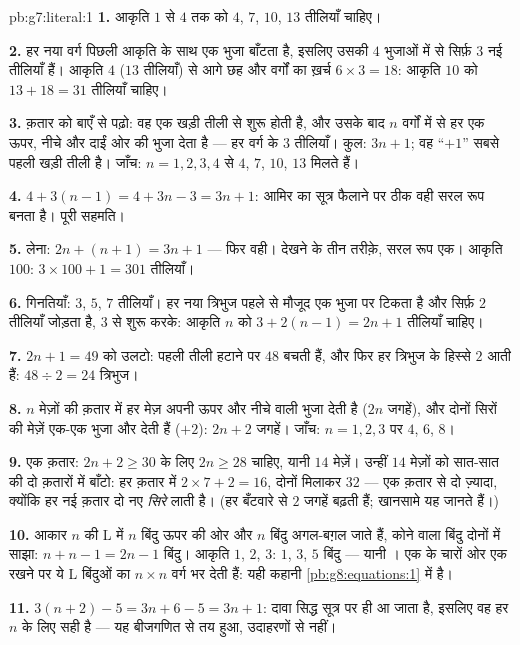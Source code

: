 \begin{solution}{pb:g7:literal:1}
\textbf{1.} आकृति $1$ से $4$ तक को $4$, $7$, $10$, $13$ तीलियाँ
चाहिए।

\textbf{2.} हर नया वर्ग पिछली आकृति के साथ एक भुजा बाँटता है,
इसलिए उसकी $4$ भुजाओं में से सिर्फ़ $3$ नई तीलियाँ हैं। आकृति
$4$ ($13$ तीलियाँ) से आगे छह और वर्गों का ख़र्च
$6 \times 3 = 18$: आकृति $10$ को $13 + 18 = 31$ तीलियाँ चाहिए।

\textbf{3.} क़तार को बाएँ से पढ़ो: वह एक खड़ी तीली से शुरू होती
है, और उसके बाद $n$ वर्गों में से हर एक ऊपर, नीचे और दाईं ओर की
भुजा देता है --- हर वर्ग के $3$ तीलियाँ। कुल: $3n + 1$; वह
``$+1$'' सबसे पहली खड़ी तीली है। जाँच: $n = 1, 2, 3, 4$ से $4$,
$7$, $10$, $13$ मिलते हैं।

\textbf{4.} $4 + 3(n - 1) = 4 + 3n - 3 = 3n + 1$: आमिर का सूत्र
फैलाने पर ठीक वही सरल रूप बनता है। पूरी सहमति।

\textbf{5.} लेना: $2n + (n + 1) = 3n + 1$ --- फिर वही। देखने के
तीन तरीक़े, सरल रूप एक। आकृति $100$: $3 \times 100 + 1 = 301$
तीलियाँ।

\textbf{6.} गिनतियाँ: $3$, $5$, $7$ तीलियाँ। हर नया त्रिभुज पहले
से मौजूद एक भुजा पर टिकता है और सिर्फ़ $2$ तीलियाँ जोड़ता है,
$3$ से शुरू करके: आकृति $n$ को $3 + 2(n - 1) = 2n + 1$ तीलियाँ
चाहिए।

\textbf{7.} $2n + 1 = 49$ को उलटो: पहली तीली हटाने पर $48$ बचती
हैं, और फिर हर त्रिभुज के हिस्से $2$ आती हैं:
$48 \div 2 = 24$ त्रिभुज।

\textbf{8.} $n$ मेज़ों की क़तार में हर मेज़ अपनी ऊपर और नीचे वाली
भुजा देती है ($2n$ जगहें), और दोनों सिरों की मेज़ें एक-एक भुजा
और देती हैं ($+2$): $2n + 2$ जगहें। जाँच: $n = 1, 2, 3$ पर $4$,
$6$, $8$।

\textbf{9.} एक क़तार: $2n + 2 \geq 30$ के लिए $2n \geq 28$ चाहिए,
यानी $14$ मेज़ें। उन्हीं $14$ मेज़ों को सात-सात की दो क़तारों में
बाँटो: हर क़तार में $2 \times 7 + 2 = 16$, दोनों मिलाकर $32$ ---
एक क़तार से दो ज़्यादा, क्योंकि हर नई क़तार दो नए \emph{सिरे}
लाती है। (हर बँटवारे से $2$ जगहें बढ़ती हैं; खानसामे यह जानते
हैं।)

\textbf{10.} आकार $n$ की L में $n$ बिंदु ऊपर की ओर और $n$ बिंदु
अगल-बग़ल जाते हैं, कोने वाला बिंदु दोनों में साझा:
$n + n - 1 = 2n - 1$ बिंदु। आकृति $1$, $2$, $3$: $1$, $3$, $5$
बिंदु --- यानी \emph{}। एक के चारों ओर एक रखने पर
ये L बिंदुओं का $n \times n$ वर्ग भर देती हैं: यही कहानी
\cref{pb:g8:equations:1} में है।

\textbf{11.} $3(n + 2) - 5 = 3n + 6 - 5 = 3n + 1$: दावा सिद्ध
सूत्र पर ही आ जाता है, इसलिए वह हर $n$ के लिए सही है --- यह
बीजगणित से तय हुआ, उदाहरणों से नहीं।


\end{solution}
